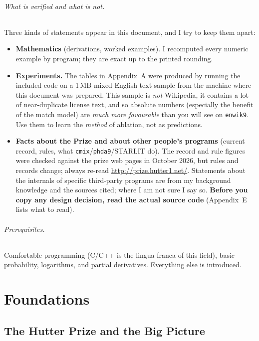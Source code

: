 \documentclass[11pt,a4paper,openany]{book}
\newcommand{\code}[1]{\texttt{#1}}
\theoremstyle{definition}
\theoremstyle{remark}
\begin{document}
\paragraph{What is verified and what is not.}
Three kinds of statements appear in this document, and I try to keep them apart:
\begin{itemize}
\item \textbf{Mathematics} (derivations, worked examples). I recomputed every numeric example by program; they are exact up to the printed rounding.
\item \textbf{Experiments.} The tables in Appendix~A were produced by running the included code on a 1\,MB mixed English text sample from the machine where this document was prepared. This sample is \emph{not} Wikipedia, it contains a lot of near-duplicate license text, and so absolute numbers (especially the benefit of the match model) are \emph{much more favourable} than you will see on \code{enwik9}. Use them to learn the \emph{method} of ablation, not as predictions.
\item \textbf{Facts about the Prize and about other people's programs} (current record, rules, what \code{cmix}/\code{phda9}/STARLIT do). The record and rule figures were checked against the prize web pages in October 2026, but rules and records change; always re-read \url{http://prize.hutter1.net/}. Statements about the internals of specific third-party programs are from my background knowledge and the sources cited; where I am not sure I say so. \textbf{Before you copy any design decision, read the actual source code} (Appendix~E lists what to read).
\end{itemize}

\paragraph{Prerequisites.} Comfortable programming (C/C++ is the lingua franca of this field), basic probability, logarithms, and partial derivatives. Everything else is introduced.

\tableofcontents
\mainmatter

\part{Foundations}

\chapter{The Hutter Prize and the Big Picture}
\end{document}
